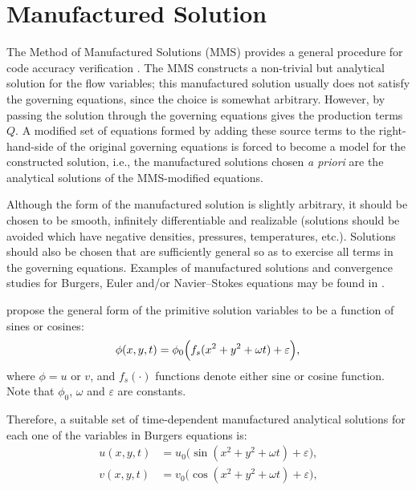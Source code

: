 \documentclass[10pt]{article}
\begin{document}
\section{Manufactured Solution}
The Method of Manufactured Solutions (MMS) provides a general procedure for  code accuracy verification \citep{Roache2002,Bond2007}. %
%
The MMS constructs a non-trivial but analytical solution for the flow variables; this manufactured
solution usually does not  satisfy the governing equations, since the choice is somewhat arbitrary. However, by passing the solution through the governing equations gives the production terms $Q$. A modified set of equations formed by adding these source terms to the right-hand-side of the original governing equations is forced to become a model for the constructed solution, i.e., the manufactured solutions chosen \textit{a priori} are the analytical solutions of the MMS-modified equations.

Although the form of the manufactured solution is slightly arbitrary, it should be chosen to be smooth, infinitely differentiable and realizable (solutions should be avoided which have negative densities, pressures, temperatures, etc.)\citep{Salari_Knupp_2000,Roy2004}. Solutions should also be chosen that are sufficiently general so as to exercise all terms in the governing equations. Examples of manufactured solutions and convergence studies for Burgers, Euler and/or Navier--Stokes equations may be found in \citet{Salari_Knupp_2000,Roy2002,Roy2004,Bond2007,Orozco2010}.

\citet{Salari_Knupp_2000} propose the general form of the primitive solution variables to be  a function of sines or cosines:
\begin{equation}
 \label{eq:manufactured01}
  \phi (x,y,t) = \phi_{0} \Big( f_s(x^2+y^2+\omega t) + \varepsilon\Big) ,\\
\end{equation}
where $\phi=u$ or $v$, and $f_s(\cdot)$ functions denote either sine or cosine function. Note that $\phi_0$, $\omega$ and $\varepsilon$ are constants.

Therefore, a suitable set of time-dependent manufactured analytical solutions for  each one of the variables in Burgers equations is:
\begin{equation}
\begin{split}
\label{eq:manufactured02}
u(x,y,t) &= u_{0} \Big( \sin(x^2+y^2+\omega t) + \varepsilon \Big) ,\\
v(x,y,t) &= v_{0} \Big( \cos(x^2+y^2+\omega t) + \varepsilon \Big) ,\\
\end{split}
\end{equation}
\end{document}

